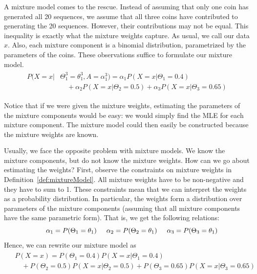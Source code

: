 A mixture model comes to the rescue. Instead of assuming that only one coin has generated all 20 sequences,
we assume that all three coins have contributed to generating the 20 sequences. However, their contributions
may not be equal. This inequality is exactly what the mixture weights capture. As usual, we call our data $ x $. Also, each mixture component is a binomial distribution, parametrized by the parameters of
the coins. These observations suffice to formulate our mixture model.
\begin{align} 
\begin{split} \label{eq:mixtureExample}
P(X=x|&\Theta_{1}^{3}=\theta_{1}^{3}, A = \alpha_{1}^{3}) 
= \alpha_{1}P(X=x|\Theta_{1}=0.4) \\
&\quad + \alpha_{2}P(X=x|\Theta_{2}=0.5) + \alpha_{3}P(X=x|\Theta_{3}=0.65)
\end{split}
\end{align}

Notice that if we were given the mixture weights, estimating
the parameters of the mixture components would be easy: we would simply find the MLE for each mixture component. The mixture
model could then easily be constructed because the mixture weights are known. 

Usually, we face the opposite problem with mixture models. We know the mixture components, but do not know the mixture weights.
How can we go about estimating the weights? First, observe the constraints
on mixture weights in Definition~\ref{def:mixtureModel}. All mixture weights have to be non-negative and they have to sum to 1.
These constraints mean that we can interpret the weights as a probability distribution. In particular, the weights form a distribution over parameters
of the mixture components (assuming that all mixture components have the same parametric form). That is, we get the following
relations:
\begin{equation}
\hskip 0.5cm \alpha_{1} = P(\Theta_{1} = \theta_{1}) \hskip 0.5cm \alpha_{2} = P(\Theta_{2} = \theta_{1}) \hskip 0.5cm \alpha_{3} = P(\Theta_{3} = \theta_{1})
\end{equation}
Hence, we can rewrite our mixture model as
\begin{align} 
\begin{split} \label{eq:probabilisticMixtureModel}
&P(X=x) 
= P(\Theta_{1} = 0.4)P(X=x|\Theta_{1}=0.4) \\
&\quad + P(\Theta_{2} = 0.5)P(X=x|\Theta_{2}=0.5) + P(\Theta_{3} = 0.65)P(X=x|\Theta_{3}=0.65)
\end{split}
\end{align}

